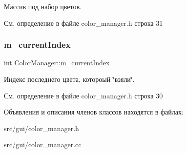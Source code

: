 Массив под набор цветов. 

См. определение в файле color\+\_\+manager.\+h строка 31

\hypertarget{class_color_manager_a7b6e45b4281881b4cf37a40dafd1a77a}{}\label{class_color_manager_a7b6e45b4281881b4cf37a40dafd1a77a} 
\subsubsection{\texorpdfstring{m\+\_\+current\+Index}{m\_currentIndex}}
{\footnotesize\ttfamily int Color\+Manager\+::m\+\_\+current\+Index\hspace{0.3cm}{\ttfamily [private]}}

Индекс последнего цвета, котороый \char`\"{}взяли\char`\"{}. 

См. определение в файле color\+\_\+manager.\+h строка 30



Объявления и описания членов классов находятся в файлах\+:\begin{DoxyCompactItemize}
\item 
src/gui/color\+\_\+manager.\+h\item 
src/gui/color\+\_\+manager.\+cc\end{DoxyCompactItemize}
